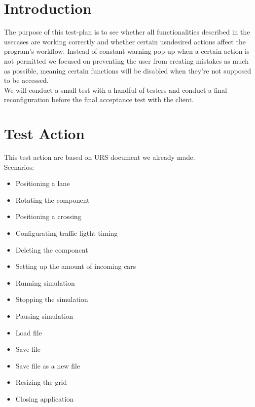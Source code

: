 \documentclass[a4paper,11pt]{article}
\title{\Title}
\author{}
\date{\today}
\begin{document}
\begin{titlepage}
\maketitle
\end{titlepage}
	\linespread{1.15}
	\tableofcontents
	\newpage
	\section{Introduction}
	The purpose of this test-plan is to see whether all functionalities described in the usecases are working correctly and whether certain usndesired actions affect the program's workflow. Instead of constant warning pop-up when a certain action is not permitted we focused on preventing the user from creating mistakes as much as possible, meaning certain functions will be disabled when they're not supposed to be accessed.\\
	We will conduct a small test with a handful of testers and conduct a final reconfiguration before the final acceptance test with the client.
	
	\section{Test Action}
	This test action are based on URS document we already made.\\
	
	Scenarios: 
	\begin{itemize}
		\item Positioning a lane
		\item Rotating the component
		\item Positioning a crossing
		\item Configurating traffic ligtht timing
		\item Deleting the component
		\item Setting up the amount of incoming cars 
		\item Running simulation
		\item Stopping the simulation
		\item Pausing simulation
		\item Load file
		\item Save file
		\item Save file as a new file
		\item Resizing the grid
		\item Closing application
	\end{itemize}
	
	\newpage
	
\end{document}
